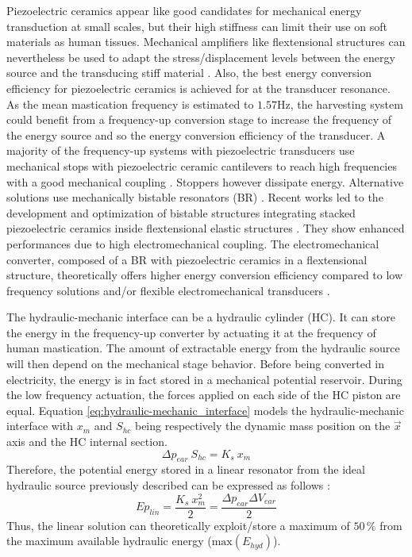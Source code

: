 \documentclass[3p,twocolumn,preprint]{elsarticle}
\begin{document}
Piezoelectric ceramics appear like good candidates for mechanical energy transduction at small scales, but their high stiffness can limit their use on soft materials as human tissues. Mechanical amplifiers like flextensional structures can nevertheless be used to adapt the stress/displacement levels between the energy source and the transducing stiff material \cite{Abdelnaby2016}. Also, the best energy conversion efficiency for piezoelectric ceramics is achieved for at the transducer resonance. As the mean mastication frequency is estimated to \mbox{$1.57$Hz}, the harvesting system could benefit from a frequency-up conversion stage \cite{Ashraf2011,Peng2021} to increase the frequency of the energy source and so the energy conversion efficiency of the transducer. A majority of the frequency-up systems with piezoelectric transducers use mechanical stops with piezoelectric ceramic cantilevers to reach high frequencies with a good mechanical coupling \cite{Edwards2013,Gu2011,Lee2007}. Stoppers however dissipate energy. Alternative solutions use mechanically bistable resonators (BR) \cite{Vocca2012}. Recent works led to the development and optimization of bistable structures integrating stacked piezoelectric ceramics inside flextensional elastic structures \cite{Huguet2017}. They show enhanced performances due to high electromechanical coupling. The electromechanical converter, composed of a BR with piezoelectric ceramics in a flextensional structure, theoretically offers higher energy conversion efficiency compared to low frequency solutions and/or flexible electromechanical transducers \cite{Abdelnaby2016,Peng2021}.

The hydraulic-mechanic interface can be a hydraulic cylinder (HC). It can store the energy in the frequency-up converter by actuating it at the frequency of human mastication. The amount of extractable energy from the hydraulic source will then depend on the mechanical stage behavior. Before being converted in electricity, the energy is in fact stored in a mechanical potential reservoir. During the low frequency actuation, the forces applied on each side of the HC piston are equal. Equation \ref{eq:hydraulic-mechanic_interface} models the hydraulic-mechanic interface with $x_{m}$ and $ S_{hc}$ being respectively the dynamic mass position on the $\vec{x}$ axis and the HC internal section.
\begin{equation}
	\Delta p_{ear}\ S_{hc} = K_{s}\ x_{m}
	\label{eq:hydraulic-mechanic_interface}
\end{equation}
Therefore, the potential energy stored in a linear resonator from the ideal hydraulic source previously described can be expressed as follows :
\begin{equation}
	Ep_{lin} = \dfrac{K_s\ x_{m}^2}{2} = \dfrac{\Delta p_{ear} \Delta V_{ear}}{2}
	\label{eq:best_linear_soution}
\end{equation}
Thus, the linear solution can theoretically exploit/store a maximum of $50\,\%$ from the maximum available hydraulic energy ($\text{max}(E_{hyd})$). 
\end{document}
